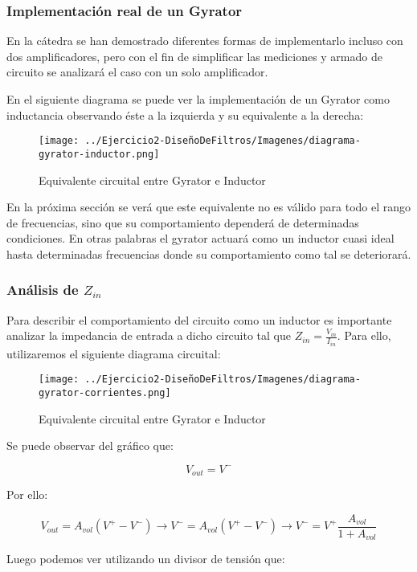 \subsubsection{Implementación real de un Gyrator}

En la cátedra se han demostrado diferentes formas de implementarlo incluso con dos amplificadores, pero con el fin de simplificar las mediciones
y armado de circuito se analizará el caso con un solo amplificador.

En el siguiente diagrama se puede ver la implementación de un Gyrator como inductancia observando éste a la izquierda y su equivalente a la derecha:

\begin{figure}[H]
    \centering
    \texttt{[image: ../Ejercicio2-DiseñoDeFiltros/Imagenes/diagrama-gyrator-inductor.png]}
    \caption{Equivalente circuital entre Gyrator e Inductor}
\end{figure}

En la próxima sección se verá que este equivalente no es válido para todo el rango de frecuencias, sino que su comportamiento dependerá de 
determinadas condiciones. En otras palabras el gyrator actuará como un inductor cuasi ideal hasta determinadas frecuencias donde su comportamiento 
como tal se deteriorará.

\subsubsection{Análisis de $Z_{in}$}

Para describir el comportamiento del circuito como un inductor es importante 
analizar la impedancia de entrada a dicho circuito tal que $Z_{in}=\frac{V_{in}}{I_{in}}$. 
Para ello, utilizaremos el siguiente diagrama circuital:

\begin{figure}[H]
    \centering
    \texttt{[image: ../Ejercicio2-DiseñoDeFiltros/Imagenes/diagrama-gyrator-corrientes.png]}
    \caption{Equivalente circuital entre Gyrator e Inductor}
\end{figure}

Se puede observar del gráfico que:

$$V_{out}=V^-$$

Por ello:

$$V_{out}=A_{vol}(V^+-V^-) \longrightarrow V^-=A_{vol}(V^+-V^-) 
\longrightarrow V^-= V^+ \frac{A_{vol}}{1+A_{vol}}$$

Luego podemos ver utilizando un divisor de tensión que:

